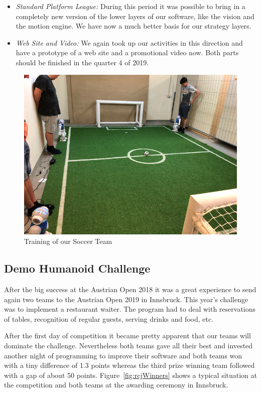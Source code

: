 \documentclass[11pt]{article}
\begin{document}
\begin{itemize}
	\item {\em Standard Platform League:} During this period it was possible to bring in a completely new version of the lower layers of our software, like the vision and the motion engine. We have now a much better basis for our strategy layers.
	
	\item {\em Web Site and Video:} We again took up our activities in this direction and have a prototype of a web site and a promotional video now. Both parts should be finished in the quarter 4 of 2019.
\end{itemize}

\begin{figure}
\begin{center}
\includegraphics[scale=0.38]{img/soccerTraining.png}
\end{center}
\caption{Training of our Soccer Team}
\label{fig:soccerTraining}
\end{figure}

\subsection{Demo Humanoid Challenge}\label{sec:demoHumanoidChallenge}
After the big success at the Austrian Open 2018 it was a great experience to send again two teams to the Austrian Open 2019 in Innsbruck. This year's challenge was to implement a restaurant waiter. The program had to deal with reservations of tables, recognition of regular guests, serving drinks and food, etc.

After the first day of competition it became pretty apparent that our teams will dominate the challenge. Nevertheless both teams gave all their best and invested another night of programming to improve their software and both teams won with a tiny difference of 1.3 points whereas the third prize winning team followed with a gap of about 50 points. Figure~\ref{fig:rcjWinners} shows a typical situation at the competition and both teams at the awarding ceremony in Innsbruck.
\end{document}
